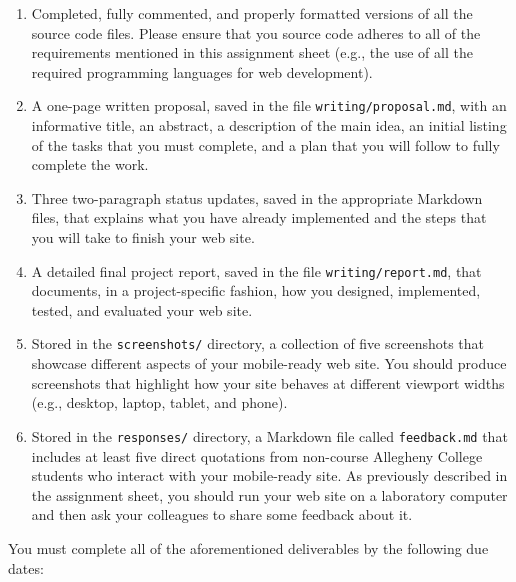 \documentclass[11pt]{article}
\newcommand{\program}[1]{\lstinline{#1}}
\begin{document}
\begin{enumerate}

  \setlength{\itemsep}{0in}

\item Completed, fully commented, and properly formatted versions of all the
  source code files. Please ensure that you source code adheres to all of the
  requirements mentioned in this assignment sheet (e.g., the use of all the
  required programming languages for web development).

\item A one-page written proposal, saved in the file
  \program{writing/proposal.md}, with an informative title, an abstract, a
  description of the main idea, an initial listing of the tasks that you must
  complete, and a plan that you will follow to fully complete the work.

\item Three two-paragraph status updates, saved in the appropriate Markdown
  files, that explains what you have already implemented and the steps that you
  will take to finish your web site.

\item A detailed final project report, saved in the file
  \program{writing/report.md}, that documents, in a project-specific fashion,
  how you designed, implemented, tested, and evaluated your web site.

\item Stored in the \program{screenshots/} directory, a collection of five
  screenshots that showcase different aspects of your mobile-ready web site.
  You should produce screenshots that highlight how your site behaves at
  different viewport widths (e.g., desktop, laptop, tablet, and phone).

\item Stored in the \program{responses/} directory, a Markdown file called
  \program{feedback.md} that includes at least five direct quotations from
  non-course Allegheny College students who interact with your mobile-ready
  site. As previously described in the assignment sheet, you should run your web
  site on a laboratory computer and then ask your colleagues to share some
  feedback about it.

\end{enumerate}

\noindent
You must complete all of the aforementioned deliverables by the following due dates:
\end{document}
